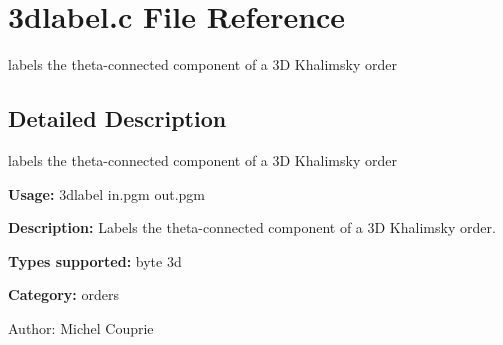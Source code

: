 \section{3dlabel.c File Reference}
\label{3dlabel_8c}
labels the theta-connected component of a 3D Khalimsky order 



\subsection{Detailed Description}
labels the theta-connected component of a 3D Khalimsky order 

{\bf Usage:} 3dlabel in.pgm out.pgm

{\bf Description:} Labels the theta-connected component of a 3D Khalimsky order.

{\bf Types supported:} byte 3d

{\bf Category:} orders

\begin{Desc}
\item[Author:]Michel Couprie \end{Desc}
